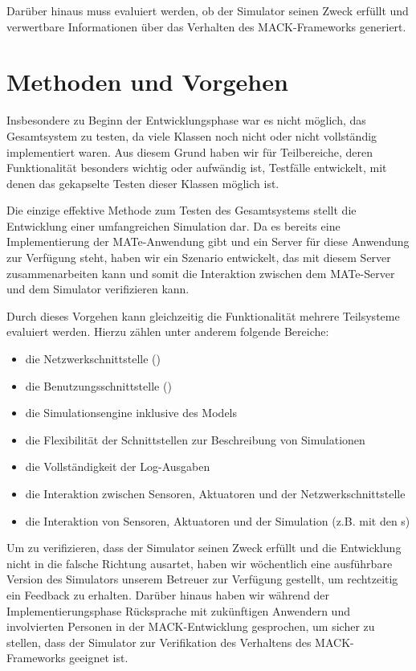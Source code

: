 Darüber hinaus muss evaluiert werden, ob der Simulator seinen Zweck erfüllt und verwertbare Informationen über das Verhalten des MACK-Frameworks generiert.

\section{Methoden und Vorgehen}\label{sec:eva_approach}
Insbesondere zu Beginn der Entwicklungsphase war es nicht möglich, das Gesamtsystem zu testen, da viele Klassen noch nicht oder nicht vollständig implementiert waren. Aus diesem Grund haben wir für Teilbereiche, deren Funktionalität besonders wichtig oder aufwändig ist, Testfälle entwickelt, mit denen das gekapselte Testen dieser Klassen möglich ist.

Die einzige effektive Methode zum Testen des Gesamtsystems stellt die Entwicklung einer umfangreichen Simulation dar. Da es bereits eine Implementierung der MATe-Anwendung gibt und ein Server für diese Anwendung zur Verfügung steht, haben wir ein Szenario entwickelt, das mit diesem Server zusammenarbeiten kann und somit die Interaktion zwischen dem MATe-Server und dem Simulator verifizieren kann.

Durch dieses Vorgehen kann gleichzeitig die Funktionalität mehrere Teilsysteme evaluiert werden. Hierzu zählen unter anderem folgende Bereiche:
\begin{itemize}
	\item die Netzwerkschnittstelle ()
	\item die Benutzungsschnittstelle ()
	\item die Simulationsengine inklusive des Models
	\item die Flexibilität der Schnittstellen zur Beschreibung von Simulationen
	\item die Vollständigkeit der Log-Ausgaben
	\item die Interaktion zwischen Sensoren, Aktuatoren und der Netzwerkschnittstelle
	\item die Interaktion von Sensoren, Aktuatoren und der Simulation (z.B. mit den s)
\end{itemize}

Um zu verifizieren, dass der Simulator seinen Zweck erfüllt und die Entwicklung nicht in die falsche Richtung ausartet, haben wir wöchentlich eine ausführbare Version des Simulators unserem Betreuer zur Verfügung gestellt, um rechtzeitig ein Feedback zu erhalten. Darüber hinaus haben wir während der Implementierungsphase Rücksprache mit zukünftigen Anwendern und involvierten Personen  in der MACK-Entwicklung gesprochen, um sicher zu stellen, dass der Simulator zur Verifikation des Verhaltens des MACK-Frameworks geeignet ist.

